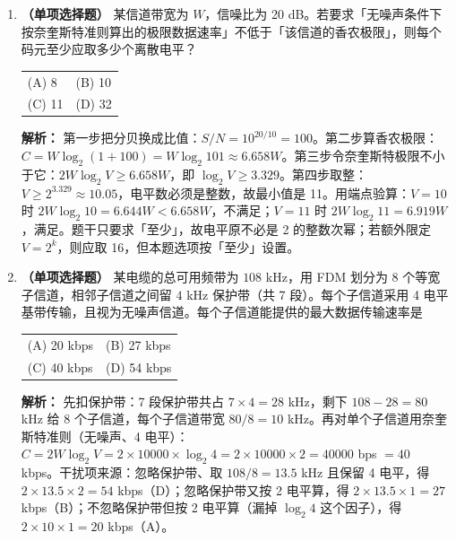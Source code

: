 \begin{enumerate}

\item \textbf{（单项选择题）} 某信道带宽为 $W$，信噪比为 20 dB。若要求「无噪声条件下按奈奎斯特准则算出的极限数据速率」不低于「该信道的香农极限」，则每个码元至少应取多少个离散电平？
\begin{center}
\begin{tabular}{ll}
(A) 8 & (B) 10 \\[4pt]
(C) 11 & (D) 32
\end{tabular}
\end{center}

\ifshowsolutions\par\noindent\textbf{解析：} 第一步把分贝换成比值：$S/N=10^{20/10}=100$。第二步算香农极限：$C=W\log_2(1+100)=W\log_2 101\approx6.658W$。第三步令奈奎斯特极限不小于它：$2W\log_2 V\ge 6.658W$，即 $\log_2 V\ge3.329$。第四步取整：$V\ge 2^{3.329}\approx10.05$，电平数必须是整数，故最小值是 11。用端点验算：$V=10$ 时 $2W\log_2 10=6.644W<6.658W$，不满足；$V=11$ 时 $2W\log_2 11=6.919W$，满足。题干只要求「至少」，故电平原不必是 2 的整数次幂；若额外限定 $V=2^k$，则应取 16，但本题选项按「至少」设置。\else \answerarea[6] \fi

\vspace{8pt}

\item \textbf{（单项选择题）} 某电缆的总可用频带为 $108$ kHz，用 FDM 划分为 8 个等宽子信道，相邻子信道之间留 $4$ kHz 保护带（共 7 段）。每个子信道采用 4 电平基带传输，且视为无噪声信道。每个子信道能提供的最大数据传输速率是
\begin{center}
\begin{tabular}{ll}
(A) 20 kbps & (B) 27 kbps \\[4pt]
(C) 40 kbps & (D) 54 kbps
\end{tabular}
\end{center}

\ifshowsolutions\par\noindent\textbf{解析：} 先扣保护带：7 段保护带共占 $7\times4=28$ kHz，剩下 $108-28=80$ kHz 给 8 个子信道，每个子信道带宽 $80/8=10$ kHz。再对单个子信道用奈奎斯特准则（无噪声、4 电平）：$C=2W\log_2 V=2\times10000\times\log_2 4=2\times10000\times2=40000$ bps $=40$ kbps。干扰项来源：忽略保护带、取 $108/8=13.5$ kHz 且保留 4 电平，得 $2\times13.5\times2=54$ kbps（D）；忽略保护带又按 2 电平算，得 $2\times13.5\times1=27$ kbps（B）；不忽略保护带但按 2 电平算（漏掉 $\log_2 4$ 这个因子），得 $2\times10\times1=20$ kbps（A）。\else \answerarea[6] \fi


\end{enumerate}
